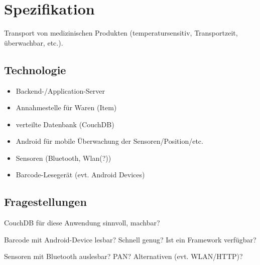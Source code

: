 \section{Spezifikation}
\label{sec:specification}

Transport von medizinischen Produkten (temperatursensitiv, Transportzeit, überwachbar, etc.).

\subsection{Technologie}

\begin{itemize}
	\item Backend-/Application-Server
	\item Annahmestelle für Waren (Item)
	\item verteilte Datenbank (CouchDB)
	\item Android für mobile Überwachung der Sensoren/Position/etc.
	\item Sensoren (Bluetooth, Wlan(?))
	\item Barcode-Lesegerät (evt. Android Devices)
\end{itemize}

\subsection{Fragestellungen}

CouchDB für diese Anwendung sinnvoll, machbar?

Barcode mit Android-Device lesbar? Schnell genug? Ist ein Framework verfügbar?

Sensoren mit Bluetooth auslesbar? PAN? Alternativen (evt. WLAN/HTTP)?

